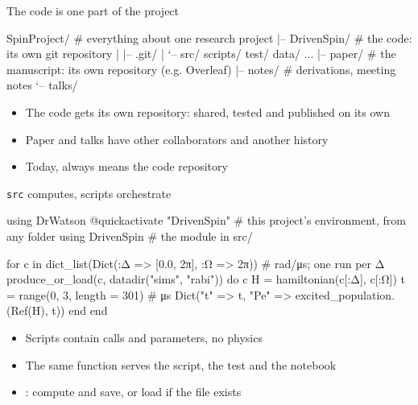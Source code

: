 \begin{frame}[fragile]{The code is one part of the project}
\begin{terminal}
SpinProject/                  # everything about one research project
|-- DrivenSpin/               # the code: its own git repository
|   |-- .git/
|   `-- src/ scripts/ test/ data/ ...
|-- paper/                    # the manuscript: its own repository (e.g. Overleaf)
|-- notes/                    # derivations, meeting notes
`-- talks/
\end{terminal}
  \begin{itemize}
    \item<2-> The code gets its own repository: shared, tested and published on its own
    \item<3-> Paper and talks have other collaborators and another history
    \item<4-> Today,  always means the code repository
  \end{itemize}
\end{frame}

\begin{frame}[fragile]{\texttt{src} computes, scripts orchestrate}
\begin{julia}[title={\hfill\tiny\color{unibasGrey}\smallcapsline{scripts/rabi.jl}}]
using DrWatson
@quickactivate "DrivenSpin"          # this project's environment, from any folder
using DrivenSpin                     # the module in src/

for c in dict_list(Dict(:Δ => [0.0, 2π], :Ω => 2π))   # rad/μs; one run per Δ
    produce_or_load(c, datadir("sims", "rabi")) do c
        H = hamiltonian(c[:Δ], c[:Ω])
        t = range(0, 3, length = 301)                  # μs
        Dict("t" => t, "Pe" => excited_population.(Ref(H), t))
    end
end
\end{julia}
  \begin{itemize}
    \item<2-> Scripts contain calls and parameters, no physics
    \item<3-> The same function serves the script, the test and the notebook
    \item<4-> : compute and save, or load if the file exists
  \end{itemize}
\end{frame}

